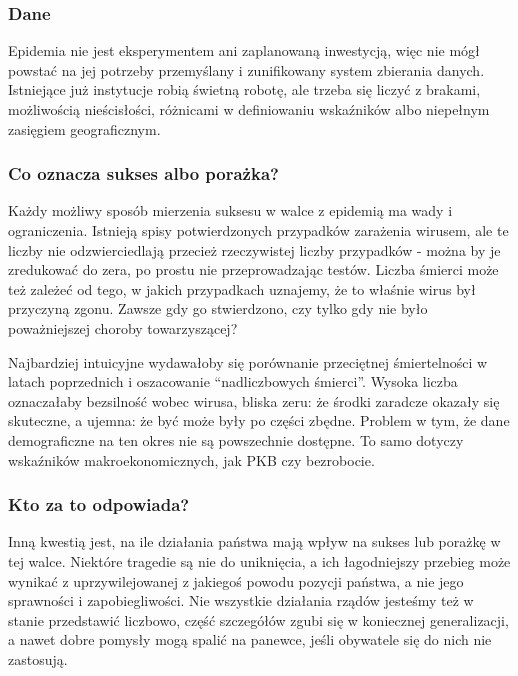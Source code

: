 \documentclass[
]{article}
\begin{document}
\hypertarget{dane}{%
\subsubsection{Dane}\label{dane}}

Epidemia nie jest eksperymentem ani zaplanowaną inwestycją, więc nie
mógł powstać na jej potrzeby przemyślany i zunifikowany system zbierania
danych. Istniejące już instytucje robią świetną robotę, ale trzeba się
liczyć z brakami, możliwością nieścisłości, różnicami w definiowaniu
wskaźników albo niepełnym zasięgiem geograficznym.

\hypertarget{co-oznacza-sukses-albo-poraux17cka}{%
\subsubsection{Co oznacza sukses albo
porażka?}\label{co-oznacza-sukses-albo-poraux17cka}}

Każdy możliwy sposób mierzenia suksesu w walce z epidemią ma wady i
ograniczenia. Istnieją spisy potwierdzonych przypadków zarażenia
wirusem, ale te liczby nie odzwierciedlają przecież rzeczywistej liczby
przypadków - można by je zredukować do zera, po prostu nie
przeprowadzając testów. Liczba śmierci może też zależeć od tego, w
jakich przypadkach uznajemy, że to właśnie wirus był przyczyną zgonu.
Zawsze gdy go stwierdzono, czy tylko gdy nie było poważniejszej choroby
towarzyszącej?

Najbardziej intuicyjne wydawałoby się porównanie przeciętnej
śmiertelności w latach poprzednich i oszacowanie ``nadliczbowych
śmierci''. Wysoka liczba oznaczałaby bezsilność wobec wirusa, bliska
zeru: że środki zaradcze okazały się skuteczne, a ujemna: że być może
były po części zbędne. Problem w tym, że dane demograficzne na ten okres
nie są powszechnie dostępne. To samo dotyczy wskaźników
makroekonomicznych, jak PKB czy bezrobocie.

\hypertarget{kto-za-to-odpowiada}{%
\subsubsection{Kto za to odpowiada?}\label{kto-za-to-odpowiada}}

Inną kwestią jest, na ile działania państwa mają wpływ na sukses lub
porażkę w tej walce. Niektóre tragedie są nie do uniknięcia, a ich
łagodniejszy przebieg może wynikać z uprzywilejowanej z jakiegoś powodu
pozycji państwa, a nie jego sprawności i zapobiegliwości. Nie wszystkie
działania rządów jesteśmy też w stanie przedstawić liczbowo, część
szczegółów zgubi się w koniecznej generalizacji, a nawet dobre pomysły
mogą spalić na panewce, jeśli obywatele się do nich nie zastosują.
\end{document}
